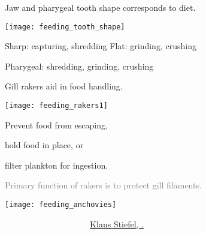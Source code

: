 \label{key}\documentclass[t]{beamer}
\begin{document}
\begin{frame}[t]{Jaw and pharygeal tooth shape corresponds to diet.}

\vspace{-0.5\baselineskip}
{\centering
\texttt{[image: feeding\_tooth\_shape]}\par
}

\vspace{-0.5\baselineskip}

\begin{multicols}{2}
Sharp: capturing, shredding\newline
Flat: grinding, crushing

\columnbreak

Pharygeal: shredding, grinding, crushing
\end{multicols}
\end{frame}


\begin{frame}[t]{Gill rakers aid in food handling.}


\vspace{-0.5\baselineskip}

\begin{multicols}{2}

\hfill\texttt{[image: feeding\_rakers1]}

\hfill{}

\columnbreak

\hangpara Prevent food from escaping,

\hangpara hold food in place, or

\hangpara filter plankton for ingestion.

\vspace{\baselineskip}

\hangpara \textcolor{gray}{Primary function of rakers is to protect gill filaments.}

\end{multicols}

\end{frame}


{
\begin{frame}[t]{}
\centering
\texttt{[image: feeding\_anchovies]}
\end{frame}
}


{
\begin{frame}[plain]

\vfilll

\tinyfill\textcolor{white}{Spawning cardinalfish, \href{https://www.flickr.com/photos/41059842@N03/6291648970}{Klaus Stiefel, .}}

\end{frame}
}
\end{document}
